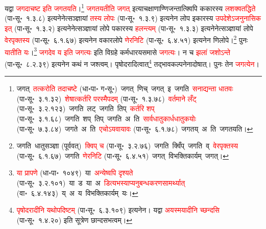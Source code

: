 \begin{sloppypar}
यद्वा \textcolor{red}{जगदाचष्ट इति जगतयति}।\footnote{जगत्~\arrow \textcolor{red}{तत्करोति तदाचष्टे} (धा॰पा॰ ग॰सू॰)~\arrow जगत्~णिच्~\arrow जगत्~इ~\arrow जगति~\arrow \textcolor{red}{सनाद्यन्ता धातवः} (पा॰सू॰~३.१.३२)~\arrow \textcolor{red}{शेषात्कर्तरि परस्मैपदम्} (पा॰सू॰~१.३.७८)~\arrow \textcolor{red}{वर्तमाने लँट्} (पा॰सू॰~३.२.१२३)~\arrow जगति~लट्~\arrow जगति~तिप्~\arrow \textcolor{red}{कर्तरि शप्‌} (पा॰सू॰~३.१.६८)~\arrow जगति~शप्~तिप्~\arrow जगति~अ~ति~\arrow \textcolor{red}{सार्वधातुकार्धधातुकयोः} (पा॰सू॰~७.३.८४)~\arrow जगते~अ~ति~\arrow \textcolor{red}{एचोऽयवायावः} (पा॰सू॰~६.१.७८)~\arrow जगतय्~अ~ति~\arrow जगतयति।} \textcolor{red}{जगतयतीति जगत्} इत्याचक्षाणाण्णिजन्तात्क्विपि ककारस्य \textcolor{red}{लशक्वतद्धिते} (पा॰सू॰~१.३.८) इत्यनेनेत्सञ्ज्ञायां \textcolor{red}{तस्य लोपः} (पा॰सू॰~१.३.९) इत्यनेन लोप इकारस्य \textcolor{red}{उपदेशेऽजनुनासिक इत्} (पा॰सू॰~१.३.२) इत्यनेनेत्सञ्ज्ञायां लोपे पकारस्य \textcolor{red}{हलन्त्यम्} (पा॰सू॰~१.३.३) इत्यनेनेत्सञ्ज्ञायां लोपे \textcolor{red}{वेरपृक्तस्य} (पा॰सू॰~६.१.६७) इत्यनेन वकार\-लोपे \textcolor{red}{णेरनिटि} (पा॰सू॰~६.४.५१) इत्यनेन णिलोपे।\footnote{जगति~\arrow धातुसञ्ज्ञा (पूर्ववत्)~\arrow \textcolor{red}{क्विप् च} (पा॰सू॰~३.२.७६)~\arrow जगति~क्विँप्~\arrow जगति~व्~\arrow \textcolor{red}{वेरपृक्तस्य} (पा॰सू॰~६.१.६७)~\arrow जगति~\arrow \textcolor{red}{णेरनिटि} (पा॰सू॰~६.४.५१)~\arrow जगत्~\arrow विभक्तिकार्यम्~\arrow जगत्।} पुनः \textcolor{red}{यातीति यः}।\footnote{\textcolor{red}{या प्रापणे} (धा॰पा॰~१०४९)~\arrow या~\arrow \textcolor{red}{अन्येष्वपि दृश्यते} (पा॰सू॰~३.२.१०१)~\arrow या~ड~\arrow या~अ~\arrow \textcolor{red}{डित्यभस्याप्यनु\-बन्धकरण\-सामर्थ्यात्} (वा॰~६.४.१४३)~\arrow य्~अ~\arrow य~\arrow विभक्तिकार्यम्~\arrow यः।} \textcolor{red}{जगदेव य इति जगत्यः} इति विग्रहे कर्मधारय\-समासे \textcolor{red}{जगत्यः}। न च \textcolor{red}{झलां जशोऽन्ते} (पा॰सू॰~८.२.३९) इत्यनेन कथं न जश्त्वम्। पृषोदरादित्वात्\footnote{\textcolor{red}{पृषोदरादीनि यथोपदिष्टम्} (पा॰सू॰~६.३.१०९) इत्यनेन। यद्वा \textcolor{red}{अयस्मयादीनि च्छन्दसि} (पा॰सू॰~१.४.२०) इति सूत्रेण छान्दसभत्वम्।} तद्भाव\-कल्पनेनादोषात्। पुनः तेन \textcolor{red}{जगत्येन}।\end{sloppypar}
